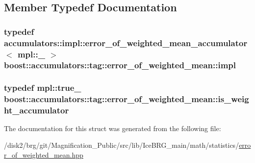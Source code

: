 \subsection{Member Typedef Documentation}
\hypertarget{structboost_1_1accumulators_1_1tag_1_1error__of__weighted__mean_a9e77d0056f0d9b30589fbf40c57cf25d}{
\subsubsection[{impl}]{\setlength{\rightskip}{0pt plus 5cm}typedef {\bf accumulators\-::impl\-::error\-\_\-of\-\_\-weighted\-\_\-mean\-\_\-accumulator}$<$ mpl\-::\-\_ $>$ {\bf boost\-::accumulators\-::tag\-::error\-\_\-of\-\_\-weighted\-\_\-mean\-::impl}}}\label{structboost_1_1accumulators_1_1tag_1_1error__of__weighted__mean_a9e77d0056f0d9b30589fbf40c57cf25d}
\hypertarget{structboost_1_1accumulators_1_1tag_1_1error__of__weighted__mean_a2e976c79a2aa15620a504bd4c87ee9bf}{
\subsubsection[{is\-\_\-weight\-\_\-accumulator}]{\setlength{\rightskip}{0pt plus 5cm}typedef mpl\-::true\-\_\- {\bf boost\-::accumulators\-::tag\-::error\-\_\-of\-\_\-weighted\-\_\-mean\-::is\-\_\-weight\-\_\-accumulator}}}\label{structboost_1_1accumulators_1_1tag_1_1error__of__weighted__mean_a2e976c79a2aa15620a504bd4c87ee9bf}


The documentation for this struct was generated from the following file\-:\begin{DoxyCompactItemize}
\item 
/disk2/brg/git/\-Magnification\-\_\-\-Public/src/lib/\-Ice\-B\-R\-G\-\_\-main/math/statistics/\hyperlink{error__of__weighted__mean_8hpp}{error\-\_\-of\-\_\-weighted\-\_\-mean.\-hpp}\end{DoxyCompactItemize}

